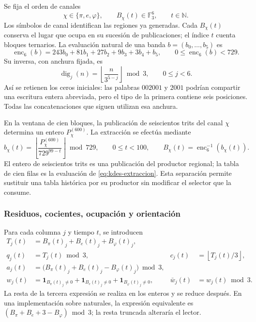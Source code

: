 Se fija el orden de canales
\[
 \chi\in\{\pi,e,\varphi\},
 \qquad B_\chi(t)\in\mathbb F_3^6,
 \qquad t\in\mathbb N.
\]
Los símbolos de canal identifican las regiones ya generadas. Cada
$B_\chi(t)$ conserva el lugar que ocupa en su sucesión de publicaciones;
el índice $t$ cuenta bloques ternarios. La evaluación natural de una
banda $b=(b_0,\ldots,b_5)$ es
\begin{equation}
 \operatorname{enc}_6(b)=
 243b_0+81b_1+27b_2+9b_3+3b_4+b_5,
 \qquad 0\leq\operatorname{enc}_6(b)<729.
 \label{eq:kdes-enc6}
\end{equation}
Su inversa, con anchura fijada, es
\[
 \operatorname{dig}_j(n)=
 \left\lfloor\frac{n}{3^{5-j}}\right\rfloor\bmod3,
 \qquad 0\leq j<6.
\]
Así se retienen los ceros iniciales: las palabras $002001$ y $2001$
podrían compartir una escritura entera abreviada, pero el tipo de la
primera contiene seis posiciones. Todas las concatenaciones que siguen
utilizan esa anchura.

En la ventana de cien bloques, la publicación de seiscientos trits del
canal $\chi$ determina un entero $P_\chi^{(600)}$. La extracción se efectúa
mediante
\begin{equation}
 b_\chi(t)=
 \left\lfloor\frac{P_\chi^{(600)}}{729^{99-t}}\right\rfloor\bmod729,
 \qquad 0\leq t<100,
 \qquad B_\chi(t)=\operatorname{enc}_6^{-1}(b_\chi(t)).
 \label{eq:kdes-extraccion}
\end{equation}
El entero de seiscientos trits es una publicación del productor regional;
la tabla de cien filas es la evaluación de
\eqref{eq:kdes-extraccion}. Esta separación permite sustituir una tabla
histórica por su productor sin modificar el selector que la consume.

\subsubsection{Residuos, cocientes, ocupación y orientación}

Para cada columna $j$ y tiempo $t$, se introducen
\begin{align}
 T_j(t)&=B_\pi(t)_j+B_e(t)_j+B_\varphi(t)_j,\\
 q_j(t)&=T_j(t)\bmod3,
 &c_j(t)&=\left\lfloor T_j(t)/3\right\rfloor,\\
 a_j(t)&=\bigl(B_\pi(t)_j+B_e(t)_j-B_\varphi(t)_j\bigr)\bmod3,\\
 w_j(t)&=\mathbf1_{B_\pi(t)_j\ne0}
       +\mathbf1_{B_e(t)_j\ne0}
       +\mathbf1_{B_\varphi(t)_j\ne0},
 &\bar w_j(t)&=w_j(t)\bmod3.
 \label{eq:kdes-firmas}
\end{align}
La resta de la tercera expresión se realiza en los enteros y se reduce
después. En una implementación sobre naturales, la expresión equivalente
es $(B_\pi+B_e+3-B_\varphi)\bmod3$; la resta truncada alteraría el lector.

